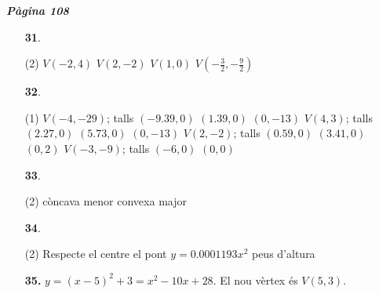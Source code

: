 \documentclass[a4paper, pdf, twoside]{book}
\begin{document}
\begin{multicols}{2}

{\textbf{\em Pàgina 108}} \hrulefill
\begin{enumerate}
\vspace{0.25cm}



 \item[\fontfamily{phv}\selectfont\color{blue}\textbf{31}. ] 
 \begin{tasks}[column-sep=1em, item-indent=1.3333em](2)
	 \task $V(-2,4)$
	 \task $V(2,-2)$
	 \task $V(1,0)$
	 \task* $V(-\frac {3}{2},-\frac {9}{2})$
\end{tasks}
 \end{enumerate}
\begin{enumerate}
\vspace{0.25cm}



 \item[\fontfamily{phv}\selectfont\color{blue}\textbf{32}. ] 
 \begin{tasks}[column-sep=1em, item-indent=1.3333em](1)
	 \task* $V(-4,-29)$; talls $(-9.39,0)$ $(1.39,0)$ $(0,-13)$
	 \task* $V(4,3)$; talls $(2.27,0)$ $(5.73,0)$ $(0,-13)$
	 \task* $V(2,-2)$; talls $(0.59,0)$ $(3.41,0)$ $(0,2)$
	 \task* $V(-3,-9)$; talls $(-6,0)$ $(0,0)$ 
\end{tasks}
\vspace{0.25cm}



 \item[\fontfamily{phv}\selectfont\color{blue}\textbf{33}. ] 
 \begin{tasks}[column-sep=1em, item-indent=1.3333em](2)
	 \task còncava
	 \task menor
	 \task convexa
	 \task major
\end{tasks}
\vspace{0.25cm}



 \item[\fontfamily{phv}\selectfont\color{blue}\textbf{34}. ] 
 \begin{tasks}[column-sep=1em, item-indent=1.3333em](2)
	 \task* Respecte el centre el pont $y=0.0001193 x^2$
	  peus d'altura
\end{tasks}
\vspace{0.25cm}
\item[\fontfamily{phv}\selectfont\color{blue}\textbf{35. }] 
$y=(x-5)^2+3 = x^2-10x+28$. El nou vèrtex és $V(5,3)$.
 \end{enumerate}
\vspace{0.3cm}


\end{multicols}
\end{document}
